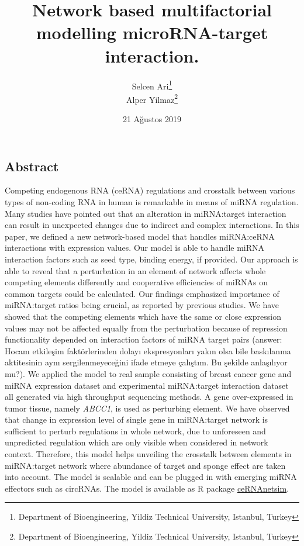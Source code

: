 \documentclass[]{article}
\title{Network based multifactorial modelling microRNA-target interaction.}
\author{Selcen Ari\footnote{Department of Bioengineering, Yildiz Technical
  University, Istanbul, Turkey} \\ Alper Yilmaz\footnote{Department of Bioengineering, Yildiz Technical
  University, Istanbul, Turkey}}
\date{21 Ağustos 2019}
\begin{document}
\maketitle

\hypertarget{abstract}{%
\subsection{Abstract}\label{abstract}}

Competing endogenous RNA (ceRNA) regulations and crosstalk between
various types of non-coding RNA in human is remarkable in means of miRNA
regulation. Many studies have pointed out that an alteration in
miRNA:target interaction can result in unexpected changes due to
indirect and complex interactions. In this paper, we defined a new
network-based model that handles miRNA:ceRNA interactions with
expression values. Our model is able to handle miRNA interaction factors
such as seed type, binding energy, if provided. Our approach is able to
reveal that a perturbation in an element of network affects whole
competing elements differently and cooperative efficiencies of miRNAs on
common targets could be calculated. Our findings emphasized importance
of miRNA:target ratios being crucial, as reported by previous studies.
We have showed that the competing elements which have the same or close
expression values may not be affected equally from the perturbation
because of repression functionality depended on interaction factors of
miRNA target pairs (answer: Hocam etkileşim faktörlerinden dolayı
ekspresyonları yakın olsa bile baskılanma aktitesinin aynı
sergilenmeyeceğini ifade etmeye çalıştım. Bu şekilde anlaşılıyor mu?).
We applied the model to real sample consisting of breast cancer gene and
miRNA expression dataset and experimental miRNA:target interaction
dataset all generated via high throughput sequencing methods. A gene
over-expressed in tumor tissue, namely \emph{ABCC1}, is used as
perturbing element. We have observed that change in expression level of
single gene in miRNA:target network is sufficient to perturb regulations
in whole network, due to unforeseen and unpredicted regulation which are
only visible when considered in network context. Therefore, this model
helps unveiling the crosstalk between elements in miRNA:target network
where abundance of target and sponge effect are taken into account. The
model is scalable and can be plugged in with emerging miRNA effectors
such as circRNAs. The model is available as R package
\href{https://github.com/selcenari/ceRNAnetsim}{ceRNAnetsim}.
\end{document}
